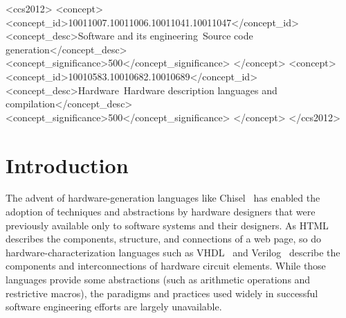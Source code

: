 \documentclass[sigplan,anonymous, review]{acmart}
\begin{document}
\begin{CCSXML}
<ccs2012>
<concept>
<concept_id>10011007.10011006.10011041.10011047</concept_id>
<concept_desc>Software and its engineering~Source code generation</concept_desc>
<concept_significance>500</concept_significance>
</concept>
<concept>
<concept_id>10010583.10010682.10010689</concept_id>
<concept_desc>Hardware~Hardware description languages and compilation</concept_desc>
<concept_significance>500</concept_significance>
</concept>
</ccs2012>
\end{CCSXML}



\maketitle

\section{Introduction}

The advent of hardware-generation languages like Chisel~\cite{chisel:article} has enabled the adoption of techniques and abstractions by hardware designers that were previously available only to software systems and their designers. As HTML describes the components, structure, and connections of a web page, so do hardware-characterization languages such as VHDL~\cite{vhdl} and Verilog~\cite{verilog} describe the components and interconnections of hardware circuit elements. While those languages provide some abstractions (such as arithmetic operations and restrictive macros), the paradigms and practices used widely in successful software engineering efforts are largely unavailable.
\end{document}
